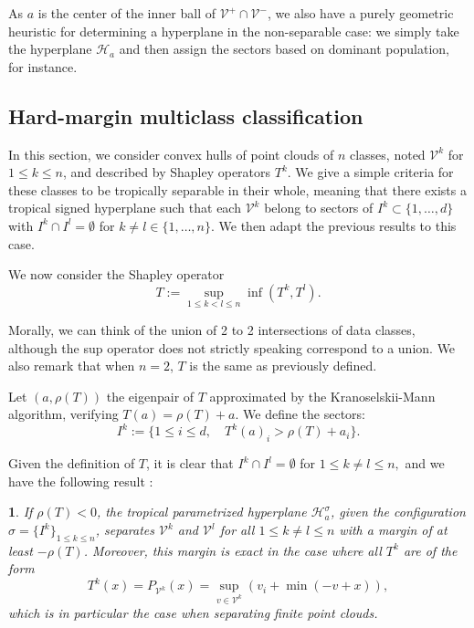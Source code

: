 \documentclass[oneside,english,a4paper]{amsart}
\numberwithin{equation}{section}
\numberwithin{figure}{section}
\theoremstyle{plain}
\theoremstyle{definition}
\theoremstyle{plain}
\newtheorem{prop}[thm]{\protect\propositionname}
\theoremstyle{remark}
\theoremstyle{plain}
\theoremstyle{definition}
\theoremstyle{definition}
\providecommand{\propositionname}{Proposition}
\begin{document}
As $a$ is the center of the inner ball of $\mathcal{V}^{+}\cap\mathcal{V}^{-}$,
we also have a purely geometric heuristic for determining a
hyperplane in the non-separable case: we simply take the hyperplane
$\mathcal{H}_{a}$ and then assign the sectors based on dominant
population, for instance.


\subsection{Hard-margin multiclass classification}

In this section, we consider convex hulls of point clouds of $n$
classes, noted $\mathcal{V}^{k}$ for $1\le k \le n$, and described by Shapley operators
$T^{k}$. We give a simple criteria for these classes to be tropically separable in their whole, meaning that there exists a tropical signed
hyperplane such that each $\mathcal{V}^{k}$ belong to sectors of $I^{k}\subset\{1,\ldots, d\}$
with $I^{k}\cap I^{l}=\emptyset$ for $k\ne l\in\{1, \ldots, n\}.$ We then adapt
the previous results to this case.

We now consider the Shapley operator
\[
T:=\sup_{1\le k<l\le n}\inf(T^{k}, T^{l}).
\]

Morally, we can think of the union of 2 to 2 intersections of data classes, although the sup operator does not strictly speaking correspond to a union. We also remark that when $n=2$, $T$ is the same as previously
defined.

Let $(a,\rho(T))$ the eigenpair of $T$ approximated by the Kranoselskii-Mann
algorithm, verifying $T(a)=\rho(T)+a$. We define the sectors:
\[
I^{k}:=\{1\le i\le d,\quad T^{k}(a)_{i}>\rho(T)+a_{i}\}.
\]

Given the definition of $T$, it is clear that $I^{k}\cap I^{l}=\emptyset$
for $1\le k\ne l\le n,$ and we have the following result :
\begin{prop}
If $\rho(T)<0$, the tropical parametrized hyperplane $\mathcal{H}_{a}^{\sigma}$,
given the configuration $\sigma=\{I^{k}\}_{1\le k\le n}$, separates $\mathcal{V}^{k}$
and $\mathcal{V}^{l}$ for all $1 \le k\ne l \le n$ with a margin of at least $-\rho(T)$.
Moreover, this margin is exact in the case where all $T^{k}$ are
of the form
\[
T^{k}(x)=P_{\mathcal{V}^{k}}(x)=\sup_{v\in \mathcal{V}^{k}}\left(v_{i}+\min(-v+x)\right),
\]
 which is in particular the case when separating finite point clouds. 
\end{prop}
\end{document}
